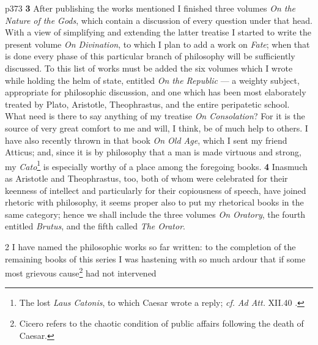 p373
\textbf{3} After publishing the works mentioned I finished three volumes \emph{On the Nature of the Gods}, which contain a discussion of every question under that head. With a view of simplifying and extending the latter treatise I started to write the present volume \emph{On Divination}, to which I plan to add a work on \emph{Fate}; when that is done every phase of this particular branch of philosophy will be sufficiently discussed. To this list of works must be added the six volumes which I wrote while holding the helm of state, entitled \emph{On the Republic} \texthebrew{—} a weighty subject, appropriate for philosophic discussion, and one which has been most elaborately treated by Plato, Aristotle, Theophrastus, and the entire peripatetic school. What need is there to say anything of my treatise \emph{On Consolation}? For it is the source of very great comfort to me and will, I think, be of much help to others. I have also recently thrown in that book \emph{On Old Age}, which I sent my friend Atticus; and, since it is by philosophy that a man is made virtuous and strong, my \emph{Cato}\texthebrew{}\footnote{The lost \emph{Laus Catonis}, to which Caesar wrote a reply; \emph{cf.} \emph{Ad Att.} XII.40 .

} is especially worthy of a place among the foregoing books. \textbf{4} Inasmuch as Aristotle and Theophrastus, too, both of whom were celebrated for their keenness of intellect and particularly for their copiousness of speech, have joined rhetoric with philosophy, it seems proper also to put my rhetorical books in the same category; hence we shall include the three volumes \emph{On Oratory}, the fourth entitled \emph{Brutus}, and the fifth called \emph{The Orator}.

2
I have named the philosophic works so far written: to the completion of the remaining books of this series I was hastening with so much ardour that if some most grievous cause\texthebrew{}\footnote{Cicero refers to the chaotic condition of public affairs following the death of Caesar.

} had not intervened

